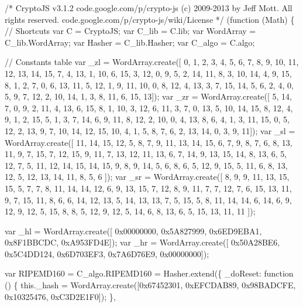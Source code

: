 \begin{DoxyCodeInclude}
\textcolor{comment}{/*}
\textcolor{comment}{CryptoJS v3.1.2}
\textcolor{comment}{code.google.com/p/crypto-js}
\textcolor{comment}{(c) 2009-2013 by Jeff Mott. All rights reserved.}
\textcolor{comment}{code.google.com/p/crypto-js/wiki/License}
\textcolor{comment}{*/}
(\textcolor{keyword}{function} (Math) \{
    \textcolor{comment}{// Shortcuts}
    var C = CryptoJS;
    var C\_lib = C.lib;
    var WordArray = C\_lib.WordArray;
    var Hasher = C\_lib.Hasher;
    var C\_algo = C.algo;

    \textcolor{comment}{// Constants table}
    var \_zl = WordArray.create([
        0,  1,  2,  3,  4,  5,  6,  7,  8,  9, 10, 11, 12, 13, 14, 15,
        7,  4, 13,  1, 10,  6, 15,  3, 12,  0,  9,  5,  2, 14, 11,  8,
        3, 10, 14,  4,  9, 15,  8,  1,  2,  7,  0,  6, 13, 11,  5, 12,
        1,  9, 11, 10,  0,  8, 12,  4, 13,  3,  7, 15, 14,  5,  6,  2,
        4,  0,  5,  9,  7, 12,  2, 10, 14,  1,  3,  8, 11,  6, 15, 13]);
    var \_zr = WordArray.create([
        5, 14,  7,  0,  9,  2, 11,  4, 13,  6, 15,  8,  1, 10,  3, 12,
        6, 11,  3,  7,  0, 13,  5, 10, 14, 15,  8, 12,  4,  9,  1,  2,
        15,  5,  1,  3,  7, 14,  6,  9, 11,  8, 12,  2, 10,  0,  4, 13,
        8,  6,  4,  1,  3, 11, 15,  0,  5, 12,  2, 13,  9,  7, 10, 14,
        12, 15, 10,  4,  1,  5,  8,  7,  6,  2, 13, 14,  0,  3,  9, 11]);
    var \_sl = WordArray.create([
         11, 14, 15, 12,  5,  8,  7,  9, 11, 13, 14, 15,  6,  7,  9,  8,
        7, 6,   8, 13, 11,  9,  7, 15,  7, 12, 15,  9, 11,  7, 13, 12,
        11, 13,  6,  7, 14,  9, 13, 15, 14,  8, 13,  6,  5, 12,  7,  5,
          11, 12, 14, 15, 14, 15,  9,  8,  9, 14,  5,  6,  8,  6,  5, 12,
        9, 15,  5, 11,  6,  8, 13, 12,  5, 12, 13, 14, 11,  8,  5,  6 ]);
    var \_sr = WordArray.create([
        8,  9,  9, 11, 13, 15, 15,  5,  7,  7,  8, 11, 14, 14, 12,  6,
        9, 13, 15,  7, 12,  8,  9, 11,  7,  7, 12,  7,  6, 15, 13, 11,
        9,  7, 15, 11,  8,  6,  6, 14, 12, 13,  5, 14, 13, 13,  7,  5,
        15,  5,  8, 11, 14, 14,  6, 14,  6,  9, 12,  9, 12,  5, 15,  8,
        8,  5, 12,  9, 12,  5, 14,  6,  8, 13,  6,  5, 15, 13, 11, 11 ]);

    var \_hl =  WordArray.create([ 0x00000000, 0x5A827999, 0x6ED9EBA1, 0x8F1BBCDC, 0xA953FD4E]);
    var \_hr =  WordArray.create([ 0x50A28BE6, 0x5C4DD124, 0x6D703EF3, 0x7A6D76E9, 0x00000000]);

    var RIPEMD160 = C\_algo.RIPEMD160 = Hasher.extend(\{
        \_doReset: \textcolor{keyword}{function} () \{
            this.\_hash  = WordArray.create([0x67452301, 0xEFCDAB89, 0x98BADCFE, 0x10325476, 0xC3D2E1F0]);
        \},


\end{DoxyCodeInclude}
